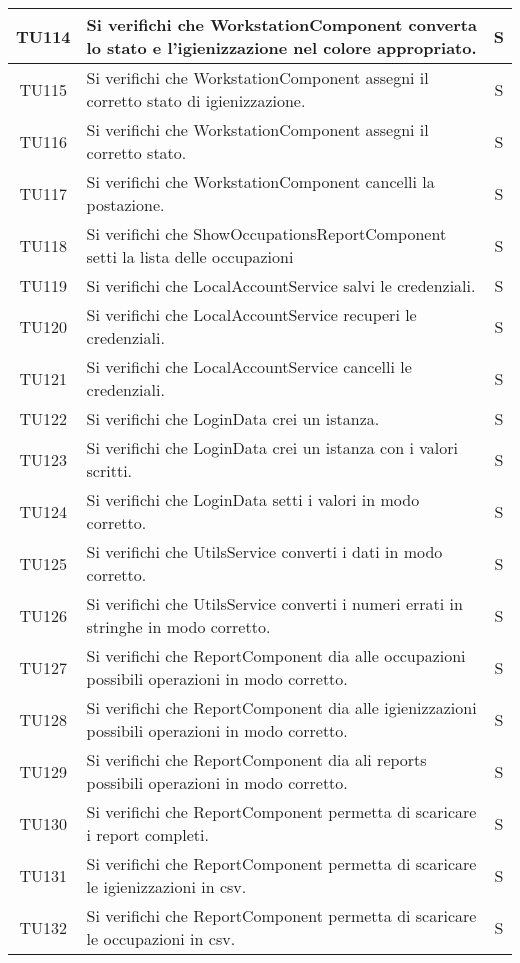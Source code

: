 \begin{center}
\begin{longtable}{|c|p{10cm}|c|}
			
			TU114 & Si verifichi che WorkstationComponent converta lo stato e l'igienizzazione nel colore appropriato.  & S \\
			\hline
			TU115 & Si verifichi che WorkstationComponent assegni il corretto stato di igienizzazione. & S \\
			\hline
			TU116 & Si verifichi che WorkstationComponent assegni il corretto stato. & S \\
			\hline
			TU117 & Si verifichi che WorkstationComponent cancelli la postazione.  & S \\
			\hline
			TU118 & Si verifichi che ShowOccupationsReportComponent setti la lista delle occupazioni   & S \\
			\hline
			TU119 & Si verifichi che LocalAccountService salvi le credenziali.  & S \\
			\hline
			TU120 & Si verifichi che LocalAccountService recuperi le credenziali.  & S \\
			\hline
			TU121 & Si verifichi che LocalAccountService cancelli le credenziali.  & S \\
			\hline
			TU122 & Si verifichi che LoginData crei un istanza.  & S \\
			\hline
			TU123 & Si verifichi che LoginData crei un istanza con i valori scritti.  & S \\
			\hline
			TU124 & Si verifichi che LoginData setti i valori in modo corretto.  & S \\
			\hline 
			TU125 & Si verifichi che UtilsService converti i dati in modo corretto.  & S \\
			\hline
			TU126 & Si verifichi che UtilsService converti i numeri errati in stringhe in modo corretto.  & S \\
			\hline
			TU127 & Si verifichi che ReportComponent dia alle occupazioni possibili operazioni in modo corretto. & S \\
			\hline
			TU128 & Si verifichi che ReportComponent dia alle igienizzazioni possibili operazioni in modo corretto.  & S \\
			\hline
			TU129 & Si verifichi che ReportComponent dia ali reports possibili operazioni in modo corretto.  & S \\
			\hline
			TU130 & Si verifichi che ReportComponent permetta di scaricare i report completi. & S \\
			\hline
			TU131 & Si verifichi che ReportComponent permetta di scaricare le igienizzazioni in csv.   & S \\
			\hline
			TU132 & Si verifichi che ReportComponent permetta di scaricare le occupazioni in csv.  & S \\

\end{longtable}
\end{center}
